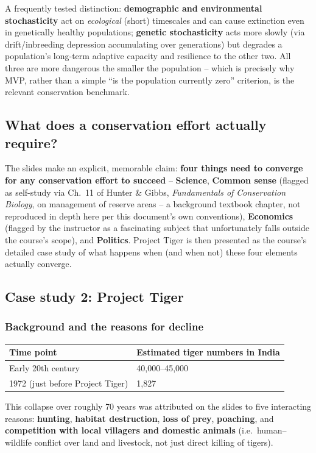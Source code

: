 \documentclass[11pt,a4paper]{article}
\begin{document}
\begin{exambox}
A frequently tested distinction: \textbf{demographic and environmental stochasticity} act on \emph{ecological} (short) timescales and can cause extinction even in genetically healthy populations; \textbf{genetic stochasticity} acts more slowly (via drift/inbreeding depression accumulating over generations) but degrades a population's long-term adaptive capacity and resilience to the other two. All three are more dangerous the smaller the population -- which is precisely why MVP, rather than a simple ``is the population currently zero'' criterion, is the relevant conservation benchmark.
\end{exambox}

\subsection{What does a conservation effort actually require?}
The slides make an explicit, memorable claim: \textbf{four things need to converge for any conservation effort to succeed} -- \textbf{Science}, \textbf{Common sense} (flagged as self-study via Ch.\ 11 of Hunter \& Gibbs, \textit{Fundamentals of Conservation Biology}, on management of reserve areas -- a background textbook chapter, not reproduced in depth here per this document's own conventions), \textbf{Economics} (flagged by the instructor as a fascinating subject that unfortunately falls outside the course's scope), and \textbf{Politics}. Project Tiger is then presented as the course's detailed case study of what happens when (and when not) these four elements actually converge.

\subsection{Case study 2: Project Tiger}
\subsubsection{Background and the reasons for decline}
\begin{center}
\begin{tabularx}{\textwidth}{@{}l X@{}}
\toprule
\textbf{Time point} & \textbf{Estimated tiger numbers in India} \\
\midrule
Early 20th century & 40,000--45,000 \\
1972 (just before Project Tiger) & 1,827 \\
\bottomrule
\end{tabularx}
\end{center}
This collapse over roughly 70 years was attributed on the slides to five interacting reasons: \textbf{hunting}, \textbf{habitat destruction}, \textbf{loss of prey}, \textbf{poaching}, and \textbf{competition with local villagers and domestic animals} (i.e.\ human--wildlife conflict over land and livestock, not just direct killing of tigers).
\end{document}
